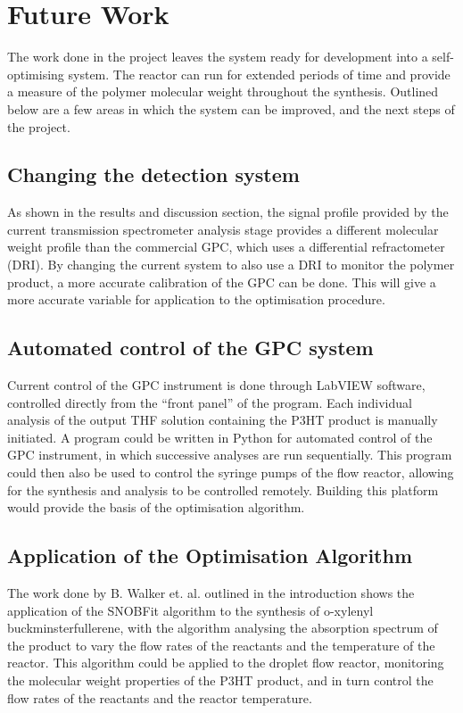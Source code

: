 \chapter{Future Work}

The work done in the project leaves the system ready for development into a self-optimising system. The reactor can run for extended periods of time and provide a measure of the polymer molecular weight throughout the synthesis. Outlined below are a few areas in which the system can be improved, and the next steps of the project.

\section{Changing the detection system}

As shown in the results and discussion section, the signal profile provided by the current transmission spectrometer analysis stage provides a different molecular weight profile than the commercial GPC, which uses a differential refractometer (DRI). By changing the current system to also use a DRI to monitor the polymer product, a more accurate calibration of the GPC can be done. This will give a more accurate variable for application to the optimisation procedure. 

\section{Automated control of the GPC system}

Current control of the GPC instrument is done through LabVIEW software, controlled directly from the “front panel” of the program. Each individual analysis of the output THF solution containing the P3HT product is manually initiated. A program could be written in Python for automated control of the GPC instrument, in which successive analyses are run sequentially. This program could then also be used to control the syringe pumps of the flow reactor, allowing for the synthesis and analysis to be controlled remotely. Building this platform would provide the basis of the optimisation algorithm. 

\section{Application of the Optimisation Algorithm}

The work done by B. Walker et. al. outlined in the introduction shows the application of the SNOBFit algorithm to the synthesis of o-xylenyl buckminsterfullerene, with the algorithm analysing the absorption spectrum of the product to vary the flow rates of the reactants and the temperature of the reactor. This algorithm could be applied to the droplet flow reactor, monitoring the molecular weight properties of the P3HT product, and in turn control the flow rates of the reactants and the reactor temperature. 

